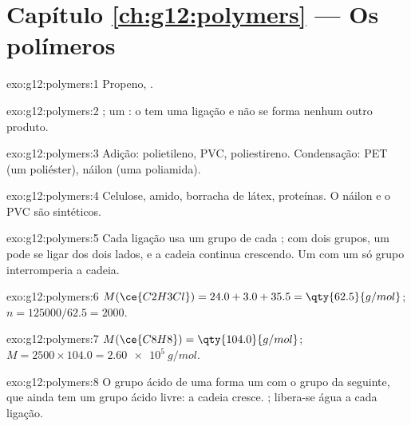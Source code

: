 \section*{Capítulo \ref{ch:g12:polymers} --- Os polímeros}

\begin{solution}{exo:g12:polymers:1}
Propeno, .
\end{solution}

\begin{solution}{exo:g12:polymers:2}
; um : o  tem uma ligação
 e não se forma nenhum outro produto.
\end{solution}

\begin{solution}{exo:g12:polymers:3}
Adição: polietileno, PVC, poliestireno. Condensação: PET (um poliéster),
náilon (uma poliamida).
\end{solution}

\begin{solution}{exo:g12:polymers:4}
Celulose, amido, borracha de látex, proteínas. O náilon e o PVC são
sintéticos.
\end{solution}

\begin{solution}{exo:g12:polymers:5}
Cada ligação usa um grupo de cada ; com dois grupos, um 
pode se ligar dos dois lados, e a cadeia continua crescendo. Um 
com um só grupo interromperia a cadeia.
\end{solution}

\begin{solution}{exo:g12:polymers:6}
$M(\ce{C2H3Cl}) = 24.0 + 3.0 + 35.5 = \qty{62.5}{g/mol}$;
$n = 125000/62.5 = 2000$.
\end{solution}

\begin{solution}{exo:g12:polymers:7}
$M(\ce{C8H8}) = \qty{104.0}{g/mol}$; $M = 2500 \times 104.0 =
\qty{2.60e5}{g/mol}$.
\end{solution}

\begin{solution}{exo:g12:polymers:8}
O grupo ácido de uma  forma um  com o grupo  da
seguinte, que ainda tem um grupo ácido livre: a cadeia cresce.  ; libera-se água a cada ligação.
\end{solution}

